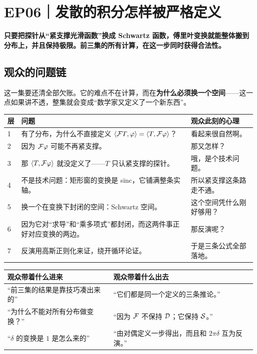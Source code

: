 \chapter{EP06｜发散的积分怎样被严格定义}

\begin{ideabox}[这一集的一句话]
\textbf{只要把探针从“紧支撑光滑函数”换成 Schwartz 函数，傅里叶变换就能整体搬到分布上，并且保持极限。前三集的所有计算，在这一步同时获得合法性。}
\end{ideabox}

\section{观众的问题链}

这一集要还清全部欠账。它的难点不在计算，而在\textbf{为什么必须换一个空间}——这一点如果讲不透，整集就会变成“数学家又定义了一个新东西”。

\begin{center}
\small
\renewcommand{\arraystretch}{1.32}
\begin{tabularx}{\textwidth}{@{}p{0.8cm}X p{4.4cm}@{}}
\toprule
层 & 问题 & 观众此刻的心理 \\
\midrule
1 & 有了分布，为什么不直接定义 $\langle \mathcal{F} T,\varphi\rangle=\langle T,\mathcal{F}\varphi\rangle$？ & 看起来很自然啊。\\
2 & 因为 $\mathcal{F}\varphi$ 可能不再紧支撑。 & 那又怎样？\\
3 & 那 $\langle T,\mathcal{F}\varphi\rangle$ 就没定义了——$T$ 只认紧支撑的探针。 & 哦，是个技术问题。\\
4 & 不是技术问题：矩形窗的变换是 sinc，它铺满整条实轴。 & 所以紧支撑这条路走不通。\\
5 & 换一个在变换下封闭的空间：Schwartz 空间。 & 这个空间凭什么刚好够用？\\
6 & 因为它对“求导”和“乘多项式”都封闭，而这两件事正好对应变换的两边。 & 那反演呢？\\
7 & 反演用高斯正则化来证，绕开循环论证。 & 于是三条公式全部落地。\\
\bottomrule
\end{tabularx}
\end{center}

\begin{center}
\small
\renewcommand{\arraystretch}{1.32}
\begin{tabularx}{\textwidth}{@{}p{3.2cm}Y@{}}
\toprule
观众带着什么进来 & 观众带着什么出去 \\
\midrule
“前三集的结果是靠技巧凑出来的” & “它们都是同一个定义的三条推论。”\\
“为什么不能对所有分布做变换？” & “因为 $\mathcal{F}$ 不保持 $\mathcal{D}$；它保持 $\mathcal{S}$。”\\
“$\delta$ 的变换是 $1$ 是怎么来的” & “由对偶定义一步得出，而且和 $2\pi\delta$ 互为反演。”\\
\bottomrule
\end{tabularx}
\end{center}

